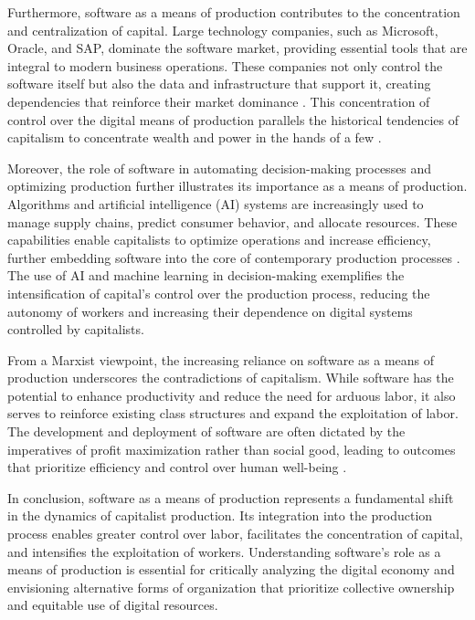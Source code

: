 \begin{refsection}
Furthermore, software as a means of production contributes to the concentration and centralization of capital. Large technology companies, such as Microsoft, Oracle, and SAP, dominate the software market, providing essential tools that are integral to modern business operations. These companies not only control the software itself but also the data and infrastructure that support it, creating dependencies that reinforce their market dominance \cite[pp.~57-60]{mcchesney2013digitaldisconnect}. This concentration of control over the digital means of production parallels the historical tendencies of capitalism to concentrate wealth and power in the hands of a few \cite[pp.~777-780]{marx2008capital}.

Moreover, the role of software in automating decision-making processes and optimizing production further illustrates its importance as a means of production. Algorithms and artificial intelligence (AI) systems are increasingly used to manage supply chains, predict consumer behavior, and allocate resources. These capabilities enable capitalists to optimize operations and increase efficiency, further embedding software into the core of contemporary production processes \cite[pp.~87-90]{noble2018algorithms}. The use of AI and machine learning in decision-making exemplifies the intensification of capital's control over the production process, reducing the autonomy of workers and increasing their dependence on digital systems controlled by capitalists.

From a Marxist viewpoint, the increasing reliance on software as a means of production underscores the contradictions of capitalism. While software has the potential to enhance productivity and reduce the need for arduous labor, it also serves to reinforce existing class structures and expand the exploitation of labor. The development and deployment of software are often dictated by the imperatives of profit maximization rather than social good, leading to outcomes that prioritize efficiency and control over human well-being \cite[pp.~98-101]{fuchs2014digital}.

In conclusion, software as a means of production represents a fundamental shift in the dynamics of capitalist production. Its integration into the production process enables greater control over labor, facilitates the concentration of capital, and intensifies the exploitation of workers. Understanding software's role as a means of production is essential for critically analyzing the digital economy and envisioning alternative forms of organization that prioritize collective ownership and equitable use of digital resources.


\end{refsection}
